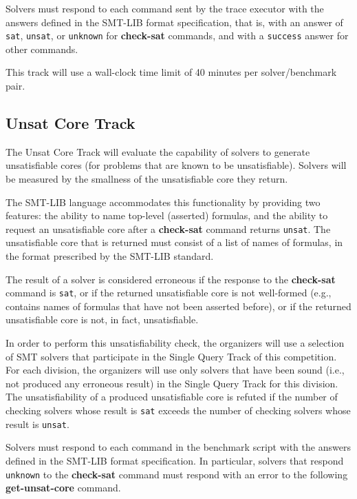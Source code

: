 \documentclass[12pt]{article}
\newcommand{\akey}[1]{\textbf{#1}}
\newcommand{\maintrack}{Single Query Track\xspace}
\newcommand{\ucoretrack}{Unsat Core Track\xspace}
\begin{document}
Solvers must respond to each command sent by the trace executor with
the answers defined in the SMT-LIB format specification, that is, with
an answer of \texttt{sat}, \texttt{unsat}, or \texttt{unknown} for
\akey{check-sat} commands, and with a \texttt{success} answer for
other commands.

This track will use a wall-clock time limit of 40 minutes per solver/benchmark
pair.

\subsection{\ucoretrack}
\label{sec:exec:unsat-core}

The \ucoretrack will evaluate the capability of solvers to
generate unsatisfiable cores (for problems that are known to be
unsatisfiable).  Solvers will be measured by the smallness of the
unsatisfiable core they return.

The SMT-LIB language accommodates this functionality by providing two
features: the ability to name top-level (asserted) formulas, and the
ability to request an unsatisfiable core after a \akey{check-sat}
command returns \texttt{unsat}.  The unsatisfiable core that is
returned must consist of a list of names of formulas, in the format
prescribed by the SMT-LIB standard.

The result of a solver is considered erroneous if the response to the
\akey{check-sat} command is \texttt{sat}, or if the returned
unsatisfiable core is not well-formed (e.g., contains names of
formulas that have not been asserted before), or if the returned
unsatisfiable core is not, in fact, unsatisfiable.

In order to perform this unsatisfiability check, the organizers will use a
selection of SMT solvers that participate in the \maintrack of this
competition.  For each division, the organizers will use only solvers that have
been sound (i.e., not produced any erroneous result) in the \maintrack for
this division.  The unsatisfiability of a produced unsatisfiable core is
refuted if the number of checking solvers whose result is \texttt{sat} exceeds
the number of checking solvers whose result is \texttt{unsat}.

Solvers must respond to each command in the benchmark script with the
answers defined in the SMT-LIB format specification.  In particular,
solvers that respond \texttt{unknown} to the \akey{check-sat} command
must respond with an error to the following \akey{get-unsat-core}
command.
\end{document}
